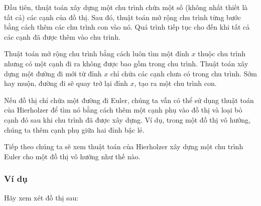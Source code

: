 Đầu tiên, thuật toán xây dựng một chu trình chứa
một số (không nhất thiết là tất cả) các cạnh của đồ thị.
Sau đó, thuật toán mở rộng chu trình
từng bước bằng cách thêm các chu trình con vào nó.
Quá trình tiếp tục cho đến khi tất cả các cạnh đã được thêm
vào chu trình.

Thuật toán mở rộng chu trình bằng cách luôn tìm
một đỉnh $x$ thuộc chu trình nhưng có
một cạnh đi ra không được bao gồm trong chu trình.
Thuật toán xây dựng một đường đi mới từ đỉnh $x$
chỉ chứa các cạnh chưa có trong chu trình.
Sớm hay muộn,
đường đi sẽ quay trở lại đỉnh $x$,
tạo ra một chu trình con.

Nếu đồ thị chỉ chứa một đường đi Euler,
chúng ta vẫn có thể sử dụng thuật toán của Hierholzer
để tìm nó bằng cách thêm một cạnh phụ vào đồ thị
và loại bỏ cạnh đó sau khi chu trình
đã được xây dựng.
Ví dụ, trong một đồ thị vô hướng,
chúng ta thêm cạnh phụ giữa hai
đỉnh bậc lẻ.

Tiếp theo chúng ta sẽ xem thuật toán của Hierholzer
xây dựng một chu trình Euler cho một đồ thị vô hướng như thế nào.

\subsubsection{Ví dụ}

\begin{samepage}
Hãy xem xét đồ thị sau:
\begin{center}
\end{center}
\end{samepage}

